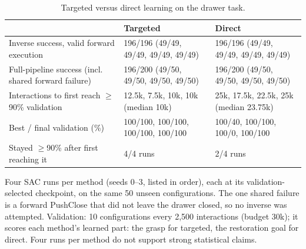 \begin{table}[t]
\centering
\footnotesize
\caption{Targeted versus direct learning on the drawer task.}
\label{tab:drawer-targeted-direct}
\begin{tabular}{@{}p{}p{}p{}@{}}
\toprule
 & Targeted & Direct \\
\midrule
Inverse success, valid forward execution & 196/196 (49/49, 49/49, 49/49, 49/49) & 196/196 (49/49, 49/49, 49/49, 49/49) \\
Full-pipeline success (incl. shared forward failure) & 196/200 (49/50, 49/50, 49/50, 49/50) & 196/200 (49/50, 49/50, 49/50, 49/50) \\
Interactions to first reach $\geq$90\% validation & 12.5k, 7.5k, 10k, 10k (median 10k) & 25k, 17.5k, 22.5k, 25k (median 23.75k) \\
Best / final validation (\%) & 100/100, 100/100, 100/100, 100/100 & 100/40, 100/100, 100/0, 100/100 \\
Stayed $\geq$90\% after first reaching it & 4/4 runs & 2/4 runs \\
\bottomrule
\end{tabular}

\vspace{2pt}\parbox{\columnwidth}{\scriptsize Four SAC runs per method (seeds 0--3, listed in order), each at its validation-selected checkpoint, on the same 50 unseen configurations. The one shared failure is a forward PushClose that did not leave the drawer closed, so no inverse was attempted. Validation: 10 configurations every 2,500 interactions (budget 30k); it scores each method's learned part: the grasp for targeted, the restoration goal for direct. Four runs per method do not support strong statistical claims.}
\end{table}

